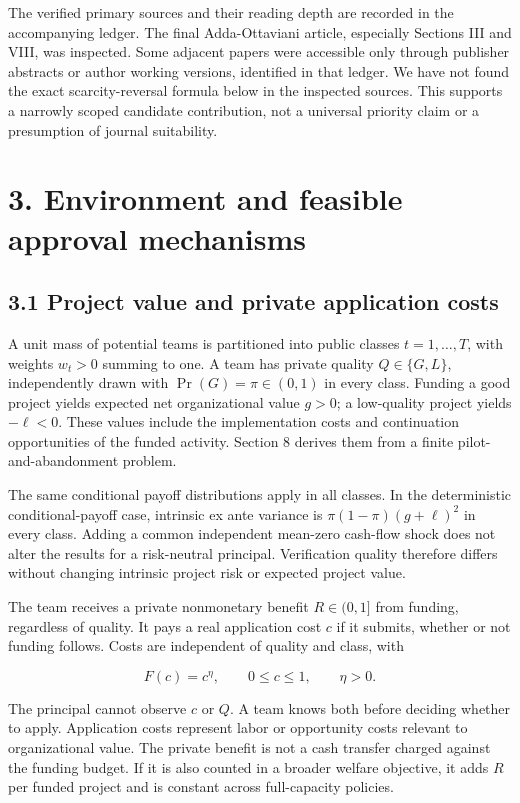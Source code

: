 \documentclass[
  11pt,
]{article}
\begin{document}
The verified primary sources and their reading depth are recorded in the
accompanying ledger. The final Adda-Ottaviani article, especially
Sections III and VIII, was inspected. Some adjacent papers were
accessible only through publisher abstracts or author working versions,
identified in that ledger. We have not found the exact scarcity-reversal
formula below in the inspected sources. This supports a narrowly scoped
candidate contribution, not a universal priority claim or a presumption
of journal suitability.

\section{3. Environment and feasible approval
mechanisms}\label{environment-and-feasible-approval-mechanisms}

\subsection{3.1 Project value and private application
costs}\label{project-value-and-private-application-costs}

A unit mass of potential teams is partitioned into public classes
\(t=1,\ldots,T\), with weights \(w_t>0\) summing to one. A team has
private quality \(Q\in\{G,L\}\), independently drawn with
\(\Pr(G)=\pi\in(0,1)\) in every class. Funding a good project yields
expected net organizational value \(g>0\); a low-quality project yields
\(-\ell<0\). These values include the implementation costs and
continuation opportunities of the funded activity. Section 8 derives
them from a finite pilot-and-abandonment problem.

The same conditional payoff distributions apply in all classes. In the
deterministic conditional-payoff case, intrinsic ex ante variance is
\(\pi(1-\pi)(g+\ell)^2\) in every class. Adding a common independent
mean-zero cash-flow shock does not alter the results for a risk-neutral
principal. Verification quality therefore differs without changing
intrinsic project risk or expected project value.

The team receives a private nonmonetary benefit \(R\in(0,1]\) from
funding, regardless of quality. It pays a real application cost \(c\) if
it submits, whether or not funding follows. Costs are independent of
quality and class, with

\[F(c)=c^{\eta},\qquad 0\leq c\leq1,\qquad \eta>0. \tag{1}\]

The principal cannot observe \(c\) or \(Q\). A team knows both before
deciding whether to apply. Application costs represent labor or
opportunity costs relevant to organizational value. The private benefit
is not a cash transfer charged against the funding budget. If it is also
counted in a broader welfare objective, it adds \(R\) per funded project
and is constant across full-capacity policies.
\end{document}
